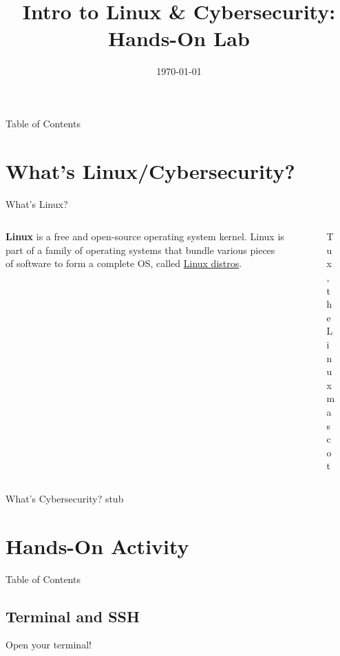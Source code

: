 \documentclass{beamer}
\title{Intro to Linux \& Cybersecurity: Hands-On Lab}
\date{\today}
\institute{Linux Users Group @ UIC\\ WiCyS @ UIC}
\begin{document}
\begin{frame}
	\titlepage
\end{frame}

\begin{frame}{Table of Contents}
	\tableofcontents[pausesections]
\end{frame}

\section{What's Linux/Cybersecurity?}
\begin{frame}{What's Linux?}
	\begin{columns}
		\begin{column}{0.5\textwidth}
			\textbf{Linux} is a free and open-source operating
			system kernel. Linux is part of a family of operating
			systems that bundle various pieces of software to form
			a complete OS, called \underline{Linux distros}.
		\end{column}
		\begin{column}{0.5\textwidth}
			\begin{figure}
				\centering
				
				\caption{Tux, the Linux mascot}
			\end{figure}
		\end{column}
	\end{columns}
\end{frame}

\begin{frame}{What's Cybersecurity?}
	stub
\end{frame}

\section{Hands-On Activity}
\begin{frame}{Table of Contents}
	\tableofcontents[currentsection]
\end{frame}

\subsection{Terminal and SSH}
\begin{frame}
	\begin{center}
		\Huge Open your terminal!
	\end{center}
\end{frame}
\end{document}
